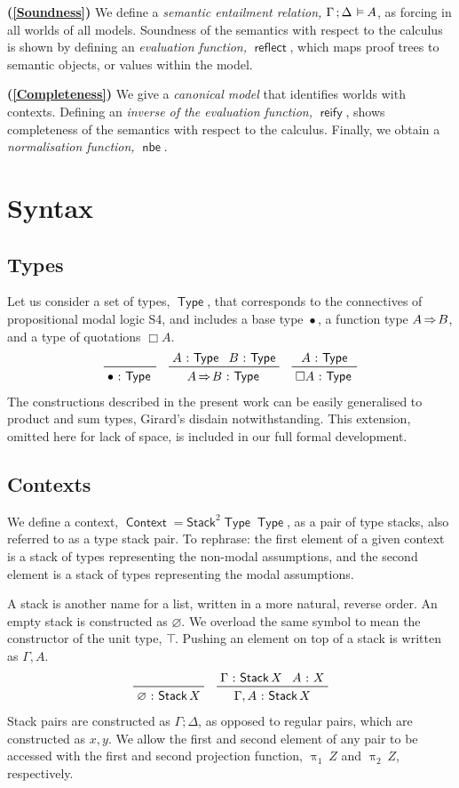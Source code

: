 \documentclass[submission,copyright,creativecommons,sharealike,backref=page]{eptcs}
\newcommand{\sA}{\mkern-2muA}
\renewcommand{\:}{\mathop{\mkern3mu:\mkern3mu}}
\renewcommand{\.}{\mathop{\mkern3mu.\mkern3mu}}
\renewcommand{\;}{\mathop{;}}
\renewcommand{\,}{\mathop{,}}
\newcommand{\ef}{\mathrel{\mkern2mu\vDash\mkern1mu}}
\newcommand{\rf}{\mathop{\Rightarrow\mkern-1mu}}
\newcommand{\reflect}{\operatorname{\textsf{reflect}}}
\newcommand{\reify}{\operatorname{\textsf{reify}}}
\newcommand{\nbe}{\operatorname{\textsf{nbe}}}
\newcommand{\pii}{\operatorname{\uppi_{\scriptscriptstyle{1}}}}
\newcommand{\piii}{\operatorname{\uppi_{\scriptscriptstyle{2}}}}
\newcommand{\Stack}{\operatorname{\textsf{Stack}}}
\newcommand{\StackII}{\operatorname{\textsf{Stack}^{\scriptscriptstyle{2}}}}
\newcommand{\Type}{\operatorname{\textsf{Type}}}
\newcommand{\Context}{\operatorname{\textsf{Context}}}
\newcommand{\base}{\mathop{\bullet}}
\renewcommand{\O}{\varnothing}
\theoremstyle{mystyle}
\begin{document}
\textbf{(\ref{Soundness})} We define a \emph{semantic entailment relation,} $\Gamma \; \Delta \ef \sA$, as forcing in all worlds of all models.  Soundness of the semantics with respect to the calculus is shown by defining an \emph{evaluation function,} $\reflect$, which maps proof trees to semantic objects, or values within the model.

\textbf{(\ref{Completeness})} We give a \emph{canonical model} that identifies worlds with contexts.  Defining an \emph{inverse of the evaluation function,} $\reify$, shows completeness of the semantics with respect to the calculus.  Finally, we obtain a \emph{normalisation function,} $\nbe$.


\section{Syntax}\label{Syntax}

\subsection{Types}
Let us consider a set of types, $\Type$, that corresponds to the connectives of propositional modal logic S4, and includes a base type $\base$, a function type $A \rf B$, and a type of quotations $\Box A$.
\begin{align*}
  \prftree
    {}
    {\base \: \Type}
  \quad
  \prftree
    {A \: \Type}{B \: \Type}
    {A \rf B \: \Type}
  \quad
  \prftree
    {A \: \Type}
    {\Box A \: \Type}
\end{align*}
The constructions described in the present work can be easily generalised to product and sum types, Girard's disdain notwithstanding.  This extension, omitted here for lack of space, is included in our full formal development.


\subsection{Contexts}
We define a context, $\Context = \StackII \Type \Type$, as a pair of type stacks, also referred to as a type stack pair.  To rephrase: the first element of a given context is a stack of types representing the non-modal assumptions, and the second element is a stack of types representing the modal assumptions.

A stack is another name for a list, written in a more natural, reverse order.  An empty stack is constructed as $\O$.  We overload the same symbol to mean the constructor of the unit type, $\top\mkern-3mu$.  Pushing an element on top of a stack is written as $\Gamma, A$.
\begin{align*}
  \prftree
    {}
    {\O \: \Stack X}
  \quad
  \prftree
    {\Gamma \: \Stack X}{A \: X}
    {\Gamma, A \: \Stack X}
\end{align*}
Stack pairs are constructed as $\Gamma \; \Delta$, as opposed to regular pairs, which are constructed as $x, y$.  We allow the first and second element of any pair to be accessed with the first and second projection function, $\pii~Z$ and $\piii~Z$, respectively.
\end{document}

